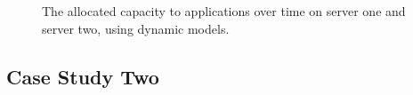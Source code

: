 \begin{figure}
	\centering
{}%
\caption[The allocated capacity to applications over time on server one and server two respectively using dynamic models.]{The allocated capacity to applications over time on \protect{} server one and \protect{} server two, using dynamic models. }
	\label{fig:case-study1}
 \end{figure}


\subsection{Case Study Two}
\label{sec:case-study2} 

